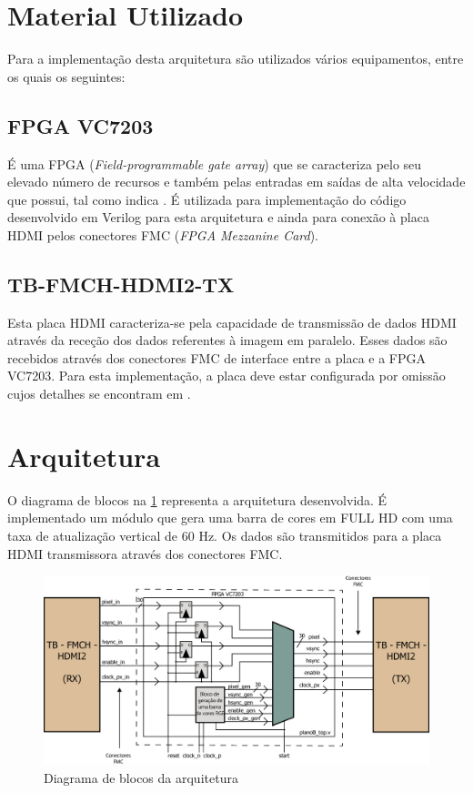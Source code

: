 \documentclass[11pt,a4paper]{article}
\begin{document}
	\section{Material Utilizado}
	Para a implementação desta arquitetura são utilizados vários equipamentos, entre os quais os seguintes:
	\subsection{FPGA VC7203}
	É uma FPGA (\textit{Field-programmable gate array}) que se caracteriza pelo seu elevado número de recursos e também pelas entradas em saídas de alta velocidade que possui, tal como indica \cite{R008}. É utilizada para implementação do código desenvolvido em Verilog para esta arquitetura e ainda para conexão à placa HDMI pelos conectores FMC (\textit{FPGA Mezzanine Card}).
	\subsection{TB-FMCH-HDMI2-TX}
	Esta placa HDMI caracteriza-se pela capacidade de transmissão de dados HDMI através da receção dos dados referentes à imagem em paralelo. Esses dados são recebidos através dos conectores FMC de interface entre a placa e a FPGA VC7203. Para esta implementação, a placa deve estar configurada por omissão cujos detalhes se encontram em \cite{R009}.
	
	\section{Arquitetura}
	
	O diagrama de blocos na \cref{fig:planoA} representa a arquitetura desenvolvida. É implementado um módulo que gera uma barra de cores em FULL HD com uma taxa de atualização vertical de 60 Hz. Os dados são transmitidos para a placa HDMI transmissora através dos conectores FMC.
	\begin{figure}[h!]
		\begin{center}
			\includegraphics[width=1.0\textwidth]{planB1} 
			\caption{Diagrama de blocos da arquitetura}
			\label{fig:planoA}
		\end{center}
	\end{figure}
\end{document}
